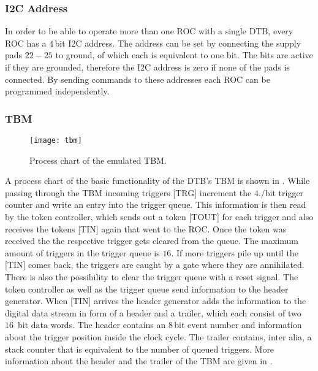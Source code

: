 \documentclass[british,11pt,a4paper]{memoir}
\begin{document}
\subsubsection{\ac{I2C} Address}\label{si2c}
In order to be able to operate more than one \ac{ROC} with a single \ac{DTB}, every \ac{ROC} has a $4\,$bit \ac{I2C} address. The address can be set by connecting the supply pads $22-25$ to ground, of which each is equivalent to one bit. The bits are active if they are grounded, therefore the \ac{I2C} address is zero if none of the pads is connected. By sending commands to these addresses each \ac{ROC} can be programmed independently.
\subsubsection{\ac{TBM}}\label{stbm}
\begin{figure}[ht]
	\centering
	\texttt{[image: tbm]}
	\caption{Process chart of the emulated \ac{TBM}.}
	\label{ptbm}
\end{figure}\no
A process chart of the basic functionality of the \ac{DTB}'s \ac{TBM} is shown in . While passing through the \ac{TBM} incoming triggers [TRG]  increment the $4./$bit trigger counter and write an entry into the trigger queue. This information is then read by the token controller, which sends out a token [TOUT] for each trigger and also receives the tokens [TIN] again that went to the \ac{ROC}. Once the token was received the the respective trigger gets cleared from the queue. The maximum amount of triggers in the trigger queue is $16$. If more triggers pile up until the [TIN] comes back, the triggers are caught by a gate where they are annihilated. There is also the possibility to clear the trigger queue with a reset signal. The token controller as well as the trigger queue send information to the header generator. When [TIN] arrives the header generator adds the information to the digital data stream in form of a header and a trailer, which each consist of two $16\,$ bit data words. The header contains an $8\,$bit event number and information about the trigger position inside the clock cycle.  The trailer contains, inter alia, a stack counter that is equivalent to the number of queued triggers. More information about the header and the trailer of the \ac{TBM} are given in . 
\end{document}
